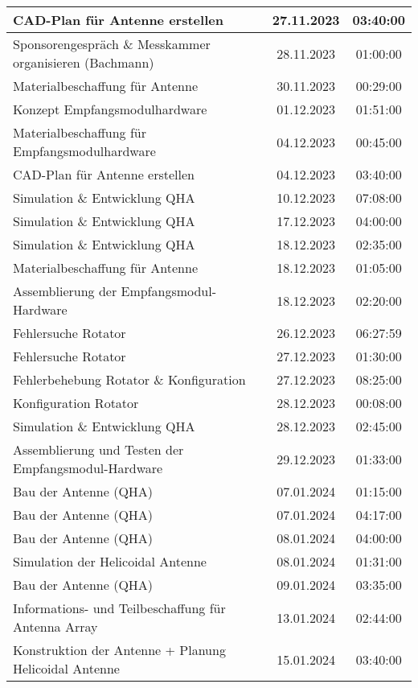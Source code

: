 \begin{longtable}{|l|c|c|}
	\hline
	CAD-Plan für Antenne erstellen & 27.11.2023 & 03:40:00 \\
	\hline
	Sponsorengespräch \& Messkammer organisieren (Bachmann) & 28.11.2023 & 01:00:00 \\
	\hline
	Materialbeschaffung für Antenne & 30.11.2023 & 00:29:00 \\
	\hline
	Konzept Empfangsmodulhardware & 01.12.2023 & 01:51:00 \\
	\hline
	Materialbeschaffung für Empfangsmodulhardware & 04.12.2023 & 00:45:00 \\
	\hline
	CAD-Plan für Antenne erstellen & 04.12.2023 & 03:40:00 \\
	\hline
	Simulation \& Entwicklung QHA & 10.12.2023 & 07:08:00 \\
	\hline
	Simulation \& Entwicklung QHA & 17.12.2023 & 04:00:00 \\
	\hline
	Simulation \& Entwicklung QHA & 18.12.2023 & 02:35:00 \\
	\hline
	Materialbeschaffung für Antenne & 18.12.2023 & 01:05:00 \\
	\hline
	Assemblierung der Empfangsmodul-Hardware & 18.12.2023 & 02:20:00 \\
	\hline
	Fehlersuche Rotator & 26.12.2023 & 06:27:59 \\
	\hline
	Fehlersuche Rotator & 27.12.2023 & 01:30:00 \\
	\hline
	Fehlerbehebung Rotator \& Konfiguration & 27.12.2023 & 08:25:00 \\
	\hline
	Konfiguration Rotator & 28.12.2023 & 00:08:00 \\
	\hline
	Simulation \& Entwicklung QHA & 28.12.2023 & 02:45:00 \\
	\hline
	Assemblierung und Testen der Empfangsmodul-Hardware & 29.12.2023 & 01:33:00 \\
	\hline
	Bau der Antenne (QHA) & 07.01.2024 & 01:15:00 \\
	\hline
	Bau der Antenne (QHA) & 07.01.2024 & 04:17:00 \\
	\hline
	Bau der Antenne (QHA) & 08.01.2024 & 04:00:00 \\
	\hline
	Simulation der Helicoidal Antenne & 08.01.2024 & 01:31:00 \\
	\hline
	Bau der Antenne (QHA) & 09.01.2024 & 03:35:00 \\
	\hline
	Informations- und Teilbeschaffung für Antenna Array & 13.01.2024 & 02:44:00 \\
	\hline
	Konstruktion der Antenne + Planung Helicoidal Antenne & 15.01.2024 & 03:40:00 \\

\end{longtable}
